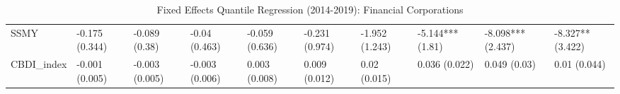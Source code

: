 \begin{table}[H]
\begin{adjustbox}{totalheight=3in, width=\columnwidth }
\begin{subtable}[c]{1.1\textwidth}
{\begin{tabular}{llllllllll}
  SSMY & -0.175 (0.344) & -0.089 (0.38) & -0.04 (0.463) & -0.059 (0.636) & -0.231 (0.974) & -1.952 (1.243) & -5.144*** (1.81) & -8.098*** (2.437) & -8.327** (3.422) \\ 
  CBDI\_index & -0.001 (0.005) & -0.003 (0.005) & -0.003 (0.006) & 0.003 (0.008) & 0.009 (0.012) & 0.02 (0.015) & 0.036 (0.022) & 0.049 (0.03) & 0.01 (0.044) \\ 
   \bottomrule
\end{tabular}}
\end{subtable}
\end{adjustbox}
\caption{Fixed Effects Quantile Regression (2014-2019): Financial Corporations} 
\label{qrfe_npl_fi}
\end{table}
